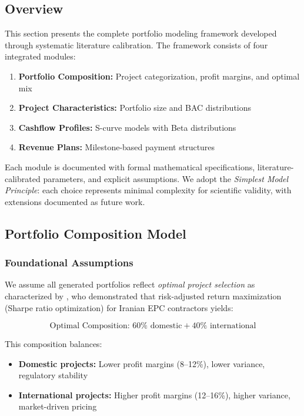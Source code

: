 \subsection{Overview}

This section presents the complete portfolio modeling framework developed through systematic literature calibration. The framework consists of four integrated modules:

\begin{enumerate}
    \item \textbf{Portfolio Composition:} Project categorization, profit margins, and optimal mix
    \item \textbf{Project Characteristics:} Portfolio size and BAC distributions
    \item \textbf{Cashflow Profiles:} S-curve models with Beta distributions
    \item \textbf{Revenue Plans:} Milestone-based payment structures
\end{enumerate}

Each module is documented with formal mathematical specifications, literature-calibrated parameters, and explicit assumptions. We adopt the \textit{Simplest Model Principle}: each choice represents minimal complexity for scientific validity, with extensions documented as future work.

\subsection{Portfolio Composition Model}

\subsubsection{Foundational Assumptions}

We assume all generated portfolios reflect \textit{optimal project selection} as characterized by \citet{khanzadi2018integrating}, who demonstrated that risk-adjusted return maximization (Sharpe ratio optimization) for Iranian EPC contractors yields:

\begin{equation}
\text{Optimal Composition: } 60\% \text{ domestic} + 40\% \text{ international}
\end{equation}

This composition balances:
\begin{itemize}
    \item \textbf{Domestic projects:} Lower profit margins (8--12\%), lower variance, regulatory stability
    \item \textbf{International projects:} Higher profit margins (12--16\%), higher variance, market-driven pricing
\end{itemize}


